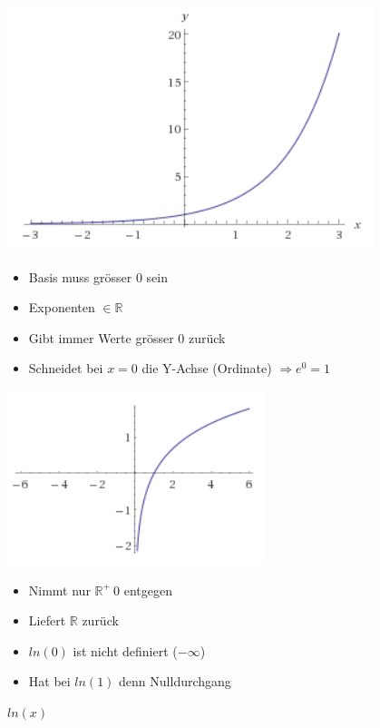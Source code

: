 \begin{figure}[ht!]
	\centering
	\begin{minipage}[t]{0.4\textwidth}
		\centering
		\includegraphics[width=\textwidth]{images/graph_e_x}
		\caption{$e^{x}$}
		\begin{itemize}
			\item Basis muss grösser 0 sein
			\item Exponenten $\in \mathbb{R}$
			\item Gibt immer Werte grösser 0 zurück
			\item Schneidet bei $x=0$ die Y-Achse (Ordinate) $\Rightarrow e^0 = 1$
		\end{itemize}
	\end{minipage}
	\begin{minipage}[t]{0.4\textwidth}
		\centering
		\includegraphics[width=\textwidth]{images/graph_ln_x}
		\caption{$ln(x)$}
		\begin{itemize}
			\item Nimmt nur $\mathbb{R}^{+} \ 0$ entgegen
			\item Liefert $\mathbb{R}$ zurück 
			\item $ln(0)$ ist nicht definiert ($-\infty$)
			\item Hat bei $ln(1)$ denn Nulldurchgang
		\end{itemize}
	\end{minipage}
\end{figure}
